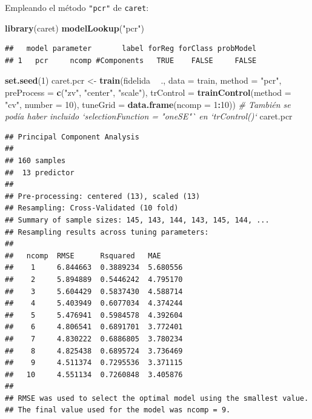 \documentclass[
]{book}
\newenvironment{Shaded}{\begin{snugshade}}{\end{snugshade}}
\newcommand{\CommentTok}[1]{\textcolor[rgb]{0.56,0.35,0.01}{\textit{#1}}}
\newcommand{\DataTypeTok}[1]{\textcolor[rgb]{0.13,0.29,0.53}{#1}}
\newcommand{\DecValTok}[1]{\textcolor[rgb]{0.00,0.00,0.81}{#1}}
\newcommand{\KeywordTok}[1]{\textcolor[rgb]{0.13,0.29,0.53}{\textbf{#1}}}
\newcommand{\NormalTok}[1]{#1}
\newcommand{\OperatorTok}[1]{\textcolor[rgb]{0.81,0.36,0.00}{\textbf{#1}}}
\newcommand{\StringTok}[1]{\textcolor[rgb]{0.31,0.60,0.02}{#1}}
\theoremstyle{break}
\theoremstyle{definition}
\theoremstyle{definition}
\theoremstyle{definition}
\theoremstyle{remark}
\begin{document}
Empleando el método \texttt{"pcr"} de \texttt{caret}:

\begin{Shaded}
\begin{Highlighting}[]
\KeywordTok{library}\NormalTok{(caret)}
\KeywordTok{modelLookup}\NormalTok{(}\StringTok{"pcr"}\NormalTok{)}
\end{Highlighting}
\end{Shaded}

\begin{verbatim}
##   model parameter       label forReg forClass probModel
## 1   pcr     ncomp #Components   TRUE    FALSE     FALSE
\end{verbatim}

\begin{Shaded}
\begin{Highlighting}[]
\KeywordTok{set.seed}\NormalTok{(}\DecValTok{1}\NormalTok{)}
\NormalTok{caret.pcr <-}\StringTok{ }\KeywordTok{train}\NormalTok{(fidelida }\OperatorTok{~}\StringTok{ }\NormalTok{., }\DataTypeTok{data =}\NormalTok{ train, }\DataTypeTok{method =} \StringTok{"pcr"}\NormalTok{,}
                   \DataTypeTok{preProcess =} \KeywordTok{c}\NormalTok{(}\StringTok{"zv"}\NormalTok{, }\StringTok{"center"}\NormalTok{, }\StringTok{"scale"}\NormalTok{),}
                   \DataTypeTok{trControl =} \KeywordTok{trainControl}\NormalTok{(}\DataTypeTok{method =} \StringTok{"cv"}\NormalTok{, }\DataTypeTok{number =} \DecValTok{10}\NormalTok{),}
                   \DataTypeTok{tuneGrid =} \KeywordTok{data.frame}\NormalTok{(}\DataTypeTok{ncomp =} \DecValTok{1}\OperatorTok{:}\DecValTok{10}\NormalTok{))}
\CommentTok{# También se podía haber incluido `selectionFunction = "oneSE"` en `trControl()`}
\NormalTok{caret.pcr}
\end{Highlighting}
\end{Shaded}

\begin{verbatim}
## Principal Component Analysis 
## 
## 160 samples
##  13 predictor
## 
## Pre-processing: centered (13), scaled (13) 
## Resampling: Cross-Validated (10 fold) 
## Summary of sample sizes: 145, 143, 144, 143, 145, 144, ... 
## Resampling results across tuning parameters:
## 
##   ncomp  RMSE      Rsquared   MAE     
##    1     6.844663  0.3889234  5.680556
##    2     5.894889  0.5446242  4.795170
##    3     5.604429  0.5837430  4.588714
##    4     5.403949  0.6077034  4.374244
##    5     5.476941  0.5984578  4.392604
##    6     4.806541  0.6891701  3.772401
##    7     4.830222  0.6886805  3.780234
##    8     4.825438  0.6895724  3.736469
##    9     4.511374  0.7295536  3.371115
##   10     4.551134  0.7260848  3.405876
## 
## RMSE was used to select the optimal model using the smallest value.
## The final value used for the model was ncomp = 9.
\end{verbatim}
\end{document}
